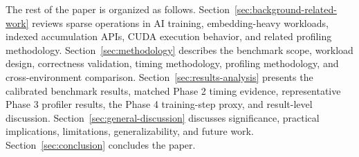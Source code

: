 The rest of the paper is organized as follows. Section~\ref{sec:background-related-work} reviews sparse operations in AI training, embedding-heavy workloads, indexed accumulation APIs, CUDA execution behavior, and related profiling methodology. Section~\ref{sec:methodology} describes the benchmark scope, workload design, correctness validation, timing methodology, profiling methodology, and cross-environment comparison. Section~\ref{sec:results-analysis} presents the calibrated benchmark results, matched Phase 2 timing evidence, representative Phase 3 profiler results, the Phase 4 training-step proxy, and result-level discussion. Section~\ref{sec:general-discussion} discusses significance, practical implications, limitations, generalizability, and future work. Section~\ref{sec:conclusion} concludes the paper.
